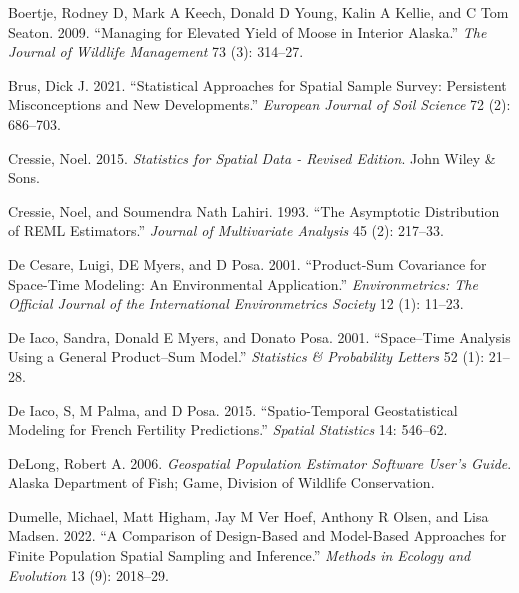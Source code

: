\documentclass[smallextended]{svjour3}       %
\newlength{\cslhangindent}
\newlength{\cslentryspacingunit} %
\newenvironment{CSLReferences}[2] %
 {%
  \setlength{\parindent}{0pt}
  \ifodd #1
  \let\oldpar\par
  \def\par{\hangindent=\cslhangindent\oldpar}
  \fi
  \setlength{\parskip}{#2\cslentryspacingunit}
 }%
 {}
\begin{document}
\hypertarget{refs}{}
\begin{CSLReferences}{1}{0}
\leavevmode{}%
Boertje, Rodney D, Mark A Keech, Donald D Young, Kalin A Kellie, and C
Tom Seaton. 2009. {``Managing for Elevated Yield of Moose in Interior
Alaska.''} \emph{The Journal of Wildlife Management} 73 (3): 314--27.

\leavevmode{}%
Brus, Dick J. 2021. {``Statistical Approaches for Spatial Sample Survey:
Persistent Misconceptions and New Developments.''} \emph{European
Journal of Soil Science} 72 (2): 686--703.

\leavevmode{}%
Cressie, Noel. 2015. \emph{Statistics for Spatial Data - Revised
Edition}. John Wiley \& Sons.

\leavevmode{}%
Cressie, Noel, and Soumendra Nath Lahiri. 1993. {``The Asymptotic
Distribution of REML Estimators.''} \emph{Journal of Multivariate
Analysis} 45 (2): 217--33.

\leavevmode{}%
De Cesare, Luigi, DE Myers, and D Posa. 2001. {``Product-Sum Covariance
for Space-Time Modeling: An Environmental Application.''}
\emph{Environmetrics: The Official Journal of the International
Environmetrics Society} 12 (1): 11--23.

\leavevmode{}%
De Iaco, Sandra, Donald E Myers, and Donato Posa. 2001. {``Space--Time
Analysis Using a General Product--Sum Model.''} \emph{Statistics \&
Probability Letters} 52 (1): 21--28.

\leavevmode{}%
De Iaco, S, M Palma, and D Posa. 2015. {``Spatio-Temporal Geostatistical
Modeling for French Fertility Predictions.''} \emph{Spatial Statistics}
14: 546--62.

\leavevmode{}%
DeLong, Robert A. 2006. \emph{Geospatial Population Estimator Software
User's Guide}. Alaska Department of Fish; Game, Division of Wildlife
Conservation.

\leavevmode{}%
Dumelle, Michael, Matt Higham, Jay M Ver Hoef, Anthony R Olsen, and Lisa
Madsen. 2022. {``A Comparison of Design-Based and Model-Based Approaches
for Finite Population Spatial Sampling and Inference.''} \emph{Methods
in Ecology and Evolution} 13 (9): 2018--29.


\end{CSLReferences}
\end{document}
